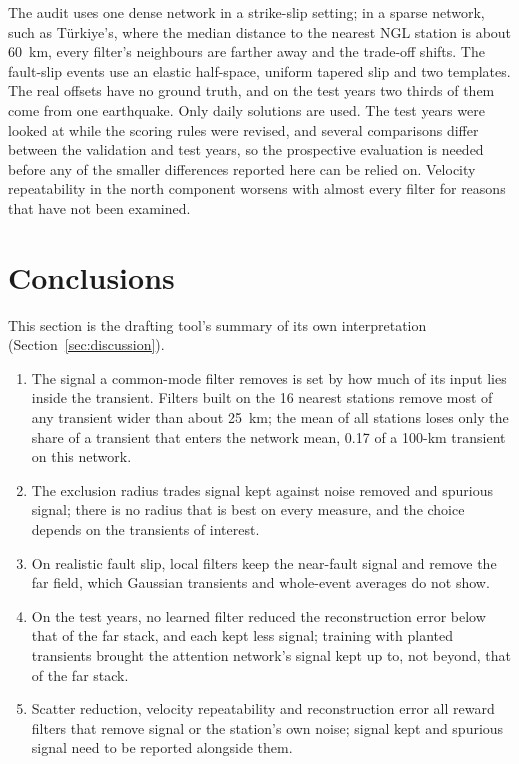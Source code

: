The audit uses one dense network in a strike-slip setting; in a sparse network, such as Türkiye's, where the median distance to the nearest NGL station is about 60~km, every filter's neighbours are farther away and the trade-off shifts. The fault-slip events use an elastic half-space, uniform tapered slip and two templates. The real offsets have no ground truth, and on the test years two thirds of them come from one earthquake. Only daily solutions are used. The test years were looked at while the scoring rules were revised, and several comparisons differ between the validation and test years, so the prospective evaluation is needed before any of the smaller differences reported here can be relied on. Velocity repeatability in the north component worsens with almost every filter for reasons that have not been examined.

\section{Conclusions}
\label{sec:conclusions}

This section is the drafting tool's summary of its own interpretation (Section~\ref{sec:discussion}).

\begin{enumerate}
  \item The signal a common-mode filter removes is set by how much of its input lies inside the transient. Filters built on the 16 nearest stations remove most of any transient wider than about 25~km; the mean of all stations loses only the share of a transient that enters the network mean, 0.17 of a 100-km transient on this network.
  \item The exclusion radius trades signal kept against noise removed and spurious signal; there is no radius that is best on every measure, and the choice depends on the transients of interest.
  \item On realistic fault slip, local filters keep the near-fault signal and remove the far field, which Gaussian transients and whole-event averages do not show.
  \item On the test years, no learned filter reduced the reconstruction error below that of the far stack, and each kept less signal; training with planted transients brought the attention network's signal kept up to, not beyond, that of the far stack.
  \item Scatter reduction, velocity repeatability and reconstruction error all reward filters that remove signal or the station's own noise; signal kept and spurious signal need to be reported alongside them.
\end{enumerate}

